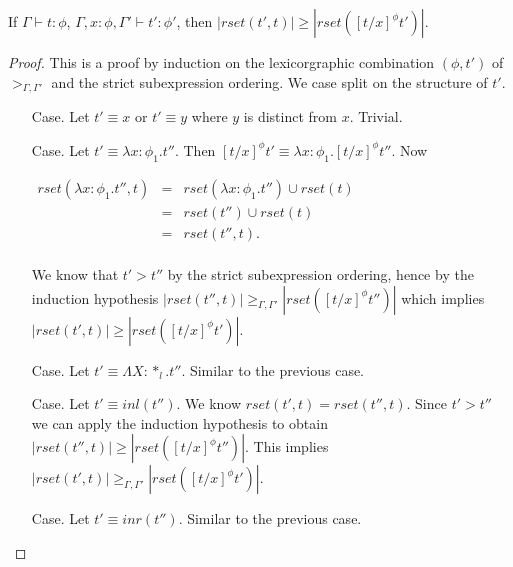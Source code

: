 \begin{lemma}
  \label{lemma:redex_preserving_ssf}
  If $\Gamma \vdash t : \phi$, $\Gamma, x:\phi, \Gamma' \vdash t':\phi'$, then
  $|rset(t', t)| \geq |rset([t/x]^\phi t')|$.
\end{lemma}
\begin{proof}
  This is a proof by induction on the lexicorgraphic combination
$(\phi, t')$ of $>_{\Gamma,\Gamma'}$ and the strict subexpression ordering.
We case split on the structure of $t'$.  
\begin{itemize}
\item[Case.] Let $t' \equiv x$ or $t' \equiv y$ where $y$ is distinct from $x$.  Trivial. 
  
\item[Case.] Let $t' \equiv \lambda x:\phi_1.t''$.  Then $[t/x]^\phi t' \equiv \lambda x:\phi_1.[t/x]^\phi t''$.
  Now 
  \begin{center}
    \begin{math}
      \begin{array}{lll}
        rset(\lambda x:\phi_1.t'', t) & = & rset(\lambda x:\phi_1.t'') \cup rset(t)\\
        & = & rset(t'') \cup rset(t)\\
        & = & rset(t'', t).\\
      \end{array}
    \end{math}
  \end{center}
  We know that $t' > t''$ by the strict subexpression ordering, hence by the induction hypothesis
  $|rset(t'', t)| \geq_{\Gamma,\Gamma'} |rset([t/x]^\phi t'')|$ which implies $|rset(t', t)| \geq |rset([t/x]^\phi t')|$.
  
\item[Case.] Let $t' \equiv \Lambda X:*_l.t''$.  Similar to the previous case.
  
\item[Case.] Let $t' \equiv inl(t'')$. We know $rset(t', t) = rset(t'', t)$.  Since $t' > t''$ we can apply
  the induction hypothesis to obtain $|rset(t'', t)| \geq |rset([t/x]^\phi t'')|$.  This implies
  $|rset(t', t)| \geq_{\Gamma,\Gamma'} |rset([t/x]^\phi t')|$.
  
\item[Case.] Let $t' \equiv inr(t'')$. Similar to the previous case.
  

\end{itemize}
\end{proof}
